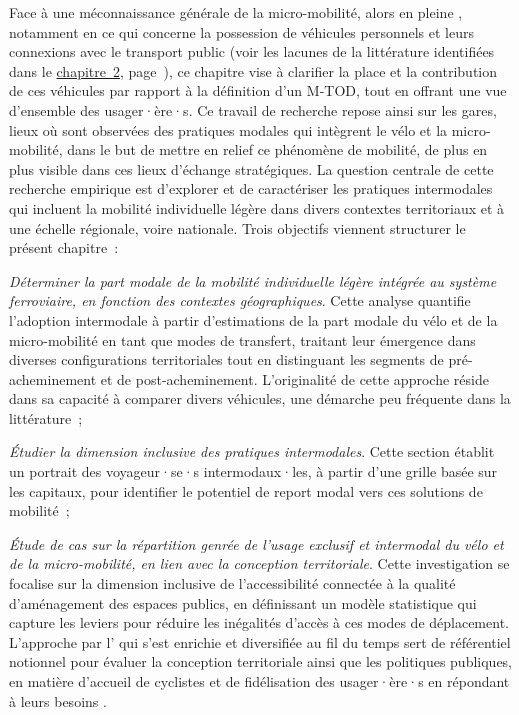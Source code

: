 \begin{refsegment}
Face à une méconnaissance générale de la \gls{micro-mobilité}, alors en pleine , notamment en ce qui concerne la possession de véhicules personnels \textcolor{blue}{\autocites{richer_dossier_2021}[19]{pages_nouveaux_2021}} et leurs connexions avec le transport public (voir les lacunes de la littérature identifiées dans le \hyperref[chap2:titre]{chapitre~2}, page~\pageref{chap2:titre}), ce chapitre vise à clarifier la place et la contribution de ces véhicules par rapport à la définition d'un \acrfull{M-TOD}, tout en offrant une vue d'ensemble des usager·ère·s. Ce travail de recherche repose ainsi sur les gares, lieux où sont observées des pratiques modales qui intègrent le \gls{vélo} et la micro-mobilité, dans le but de mettre en relief ce phénomène de mobilité, de plus en plus visible dans ces lieux d'échange stratégiques. La question centrale de cette recherche empirique est d'explorer et de caractériser les pratiques intermodales qui incluent la mobilité individuelle légère dans divers contextes territoriaux et à une échelle régionale, voire nationale. Trois objectifs viennent structurer le présent chapitre~:
\begin{customitemize}
    \item \textsl{Déterminer la part modale de la mobilité individuelle légère intégrée au système ferroviaire, en fonction des contextes géographiques}. Cette analyse quantifie l'adoption intermodale à partir d'estimations de la part modale du vélo et de la micro-mobilité en tant que modes de transfert, traitant leur émergence dans diverses configurations territoriales tout en distinguant les segments de pré-acheminement et de post-acheminement. L'originalité de cette approche réside dans sa capacité à comparer divers véhicules, une démarche peu fréquente dans la littérature~;
    \item \textsl{Étudier la dimension inclusive des pratiques intermodales}. Cette section établit un portrait des voyageur·se·s intermodaux·les, à partir d'une grille basée sur les capitaux, pour identifier le potentiel de report modal vers ces solutions de mobilité~;
    \item \textsl{Étude de cas sur la répartition genrée de l'usage exclusif et intermodal du vélo et de la micro-mobilité, en lien avec la conception territoriale}. Cette investigation se focalise sur la dimension inclusive de l'accessibilité connectée à la qualité d'aménagement des espaces publics, en définissant un modèle statistique qui capture les leviers pour réduire les inégalités d'accès à ces modes de déplacement. L'approche par l' qui s'est enrichie et diversifiée au fil du temps sert de référentiel notionnel pour évaluer la conception territoriale ainsi que les politiques publiques, en matière d'accueil de cyclistes et de fidélisation des usager·ère·s en répondant à leurs besoins \textcolor{blue}{\autocite[3]{talandier_lhospitalite_2023}}.
\end{customitemize}%


\end{refsegment}
